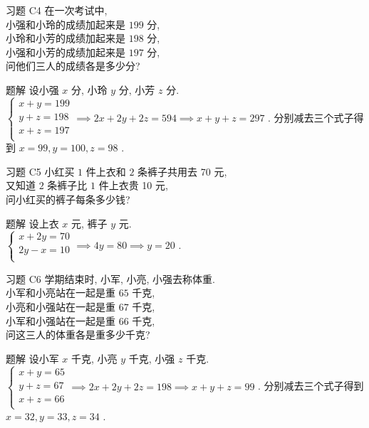 \documentclass[content.tex]{subfiles}
\begin{document}
\begin{frame}{习题 C4}
在一次考试中, \\
小强和小玲的成绩加起来是 $199$ 分, \\
小玲和小芳的成绩加起来是 $198$ 分, \\
小强和小芳的成绩加起来是 $197$ 分, \\
问他们三人的成绩各是多少分?
\begin{exampleblock}{题解}
设小强 $x$ 分, 小玲 $y$ 分, 小芳 $z$ 分. \\
$
\begin{cases}
x + y = 199 \\
y + z = 198 \\
x + z = 197 \\
\end{cases}
\implies 2x + 2y + 2z = 594 \implies x + y + z = 297 
$ . 分别减去三个式子得到 $x = 99, y = 100, z = 98$ .
\end{exampleblock}
\end{frame}

\begin{frame}{习题 C5}
小红买 $1$ 件上衣和 $2$ 条裤子共用去 70 元, \\
又知道 $2$ 条裤子比 $1$ 件上衣贵 10 元, \\
问小红买的裤子每条多少钱?
\begin{exampleblock}{题解}
设上衣 $x$ 元, 裤子 $y$ 元. \\
$
\begin{cases}
x + 2y = 70 \\
2y - x = 10 \\
\end{cases}
\implies 4y = 80 \implies y = 20 
$ .
\end{exampleblock}
\end{frame}

\begin{frame}{习题 C6}
学期结束时, 小军, 小亮, 小强去称体重. \\
小军和小亮站在一起是重 $65$ 千克, \\
小亮和小强站在一起是重 $67$ 千克, \\
小军和小强站在一起是重 $66$ 千克, \\
问这三人的体重各是重多少千克?
\begin{exampleblock}{题解}
设小军 $x$ 千克, 小亮 $y$ 千克, 小强 $z$ 千克. \\
$
\begin{cases}
x + y = 65 \\
y + z = 67 \\
x + z = 66 \\
\end{cases}
\implies 2x + 2y + 2z = 198 \implies x + y + z = 99 
$ . 分别减去三个式子得到 $x = 32, y = 33, z = 34$ .
\end{exampleblock}
\end{frame}
\end{document}
